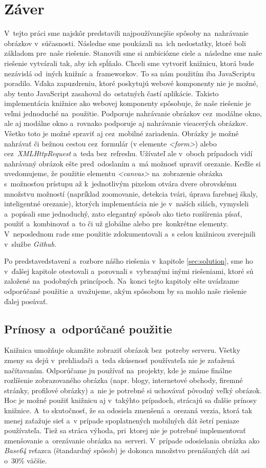 \chapter{Záver}
V~tejto práci sme najskôr predstavili najpoužívanejšie spôsoby na~nahrávanie obrázkov v~súčasnosti. Následne sme poukázali na~ich nedostatky, ktoré boli základom pre~naše riešenie. Stanovili sme si ambiciózne ciele a~následne sme naše riešenie vytvárali tak, aby ich spĺňalo.
Chceli sme vytvoriť knižnicu, ktorá bude nezávislá od~iných knižníc a~frameworkov. To sa nám použitím iba JavaScriptu poradilo. Vďaka zapuzdreniu, ktoré poskytujú webové komponenty nie je možné, aby tento JavaScript zasahoval do~ostatných častí aplikácie. Takisto implementácia knižnice ako webovej komponenty spôsobuje, že naše riešenie je veľmi jednoduché na~použitie.
Podporuje nahrávanie obrázkov cez~modálne okno, ale aj modálne okno a~rovnako podporuje aj nahrávanie vieacerých obrázkov. Všetko toto je možné spraviť aj cez~mobilné zariadenia. Obrázky je možné nahrávať či bežnou cestou cez~formulár (v elemente \emph{<form>}) alebo cez~\emph{XMLHttpRequest} a~teda bez~refreshu. Užívateľ ale v~oboch prípadoch vidí nahrávaný obrázok ešte pred~odoslaním a~má možnosť upraviť orezanie.
Keďže si uvedomujeme, že použitie elementu \emph{<canvas>} na~zobrazenie obrázka s~možnosťou prístupu až k~jednotlivým pixelom otvára dvere obrovskému množstvu možností (napríklad zoomovanie, detekcia tvári, úprava farebnej škaly, inteligentné orezanie), ktorých implementácia nie je v~naších silách, vymysleli a~popísali sme jednoduchý, zato elegantný spôsob ako tieto rozšírenia písať, použiť a~kombinovať a~to či už globálne alebo pre~konkrétne elementy. V~neposlednom rade sme použitie zdokumentovali a~s celou knižnicou zverejnili v~službe \emph{Github}.

Po predstavedstavení a~rozbore nášho riešenia v~kapitole \ref{sec:solution}, sme ho v~ďalšej kapitole otestovali a~porovnali s~vybranými inými riešeniami, ktoré sú založené na~podobných princípoch. Na~konci tejto kapitoly ešte uvádzame odporúčané použitie a~uvažujeme, akým spôsobom by sa mohlo naše riešenie ďalej posúvať. 


\section{Prínosy a~odporúčané použitie}

Knižnica umožňuje okamžite zobraziť obrázok bez~potreby serveru. Všetky zmeny sa dejú v~prehliadači a~teda skúsenosť používateľa nie je zaťažená načítavaním. Odporúčame ju používať na~projekty, kde je známe finálne rozlíšenie zobrazovaného obrázka (napr. blogy, internetové obchody, firemné stránky, profilové obrázky) a~nie je potrebné si uchovávať pôvodný veľký obrázok. Hoc je možné použiť knižnicu aj v~takýhto prípadoch, strácajú sa ďalšie prínosy knižnice. A~to skutočnosť, že sa odosiela zmenšená a~orezaná verzia, ktorá tak menej zaťažuje sieť a~v prípade spoplatnených mobilných dát šetrí peniaze používateľa. Tiež sa stráca výhoda, pri~ktorej nie je potrebné implementovať zmenšovanie a~orezávanie obrázka na~serveri. V~prípade odosielania obrázka ako \emph{Base64} reťazca (štandardný spôsob) je dokonca množstvo prenášaných dát asi o~30\% väčšie.


